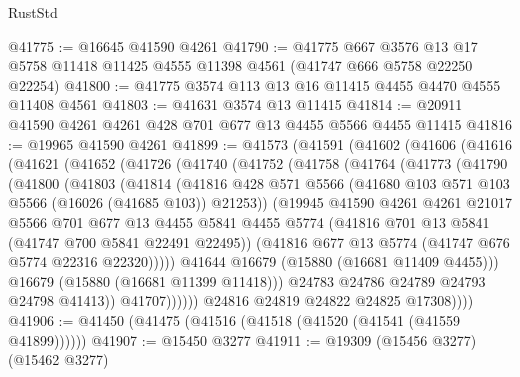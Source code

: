 \begin{lexlean}{RustStd}
\begin{coremodule}
@41775 := @16645 @41590 @4261
@41790 := @41775
    @667
    @3576
    @13
    @17
    @5758
    @11418
    @11425
    @4555
    @11398
    @4561
    (@41747 @666 @5758 @22250 @22254)
@41800 := @41775 @3574 @113 @13 @16 @11415 @4455 @4470 @4555 @11408 @4561
@41803 := @41631 @3574 @13 @11415
@41814 := @20911 @41590 @4261 @4261 @428 @701 @677 @13 @4455 @5566 @4455 @11415
@41816 := @19965 @41590 @4261
@41899 := @41573
    (@41591
      (@41602
        (@41606
          (@41616
            (@41621
              (@41652
                (@41726
                  (@41740
                    (@41752
                      (@41758
                        (@41764
                          (@41773
                            (@41790
                              (@41800
                                (@41803
                                  (@41814
                                    (@41816
                                      @428
                                      @571
                                      @5566
                                      (@41680 @103 @571 @103 @5566 (@16026 (@41685 @103)) @21253))
                                    (@19945
                                      @41590
                                      @4261
                                      @4261
                                      @21017
                                      @5566
                                      @701
                                      @677
                                      @13
                                      @4455
                                      @5841
                                      @4455
                                      @5774
                                      (@41816 @701 @13 @5841 (@41747 @700 @5841 @22491 @22495))
                                      (@41816 @677 @13 @5774 (@41747 @676 @5774 @22316 @22320)))))
                                @41644
                                @16679
                                (@15880 (@16681 @11409 @4455)))
                              @16679
                              (@15880 (@16681 @11399 @11418)))
                            @24783
                            @24786
                            @24789
                            @24793
                            @24798
                            @41413))
                        @41707))))))
            @24816
            @24819
            @24822
            @24825
            @17308))))
@41906 := @41450 (@41475 (@41516 (@41518 (@41520 (@41541 (@41559 @41899))))))
@41907 := @15450 @3277
@41911 := @19309 (@15456 @3277) (@15462 @3277)

\end{coremodule}
\end{lexlean}
